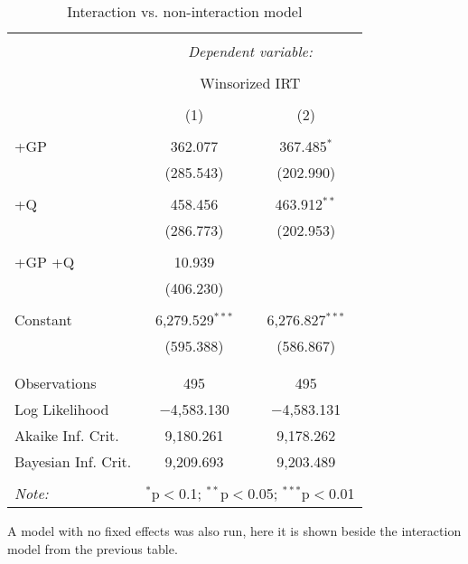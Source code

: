 \documentclass[]{tufte-handout}
\begin{document}
\begin{table}[!htbp] \centering 
  \caption{Interaction vs. non-interaction model} 
  \label{} 
\begin{tabular}{@{\extracolsep{5pt}}lcc} 
\\[-1.8ex]\hline 
\hline \\[-1.8ex] 
 & \multicolumn{2}{c}{\textit{Dependent variable:}} \\ 
\cline{2-3} 
\\[-1.8ex] & \multicolumn{2}{c}{Winsorized IRT} \\ 
\\[-1.8ex] & (1) & (2)\\ 
\hline \\[-1.8ex] 
 +GP & 362.077 & 367.485$^{*}$ \\ 
  & (285.543) & (202.990) \\ 
  & & \\ 
 +Q & 458.456 & 463.912$^{**}$ \\ 
  & (286.773) & (202.953) \\ 
  & & \\ 
 +GP +Q & 10.939 &  \\ 
  & (406.230) &  \\ 
  & & \\ 
 Constant & 6,279.529$^{***}$ & 6,276.827$^{***}$ \\ 
  & (595.388) & (586.867) \\ 
  & & \\ 
\hline \\[-1.8ex] 
Observations & 495 & 495 \\ 
Log Likelihood & $-$4,583.130 & $-$4,583.131 \\ 
Akaike Inf. Crit. & 9,180.261 & 9,178.262 \\ 
Bayesian Inf. Crit. & 9,209.693 & 9,203.489 \\ 
\hline 
\hline \\[-1.8ex] 
\textit{Note:}  & \multicolumn{2}{r}{$^{*}$p$<$0.1; $^{**}$p$<$0.05; $^{***}$p$<$0.01} \\ 
\end{tabular} 
\end{table}

A model with no fixed effects was also run, here it is shown beside the
interaction model from the previous table.
\end{document}

